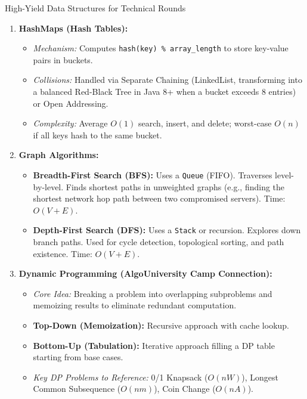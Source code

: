 \documentclass[11pt,a4paper]{article}
\begin{document}
\begin{techbox}{High-Yield Data Structures for Technical Rounds}
\begin{enumerate}
    \item \textbf{HashMaps (Hash Tables):}
    \begin{itemize}
        \item \textit{Mechanism:} Computes \texttt{hash(key) \% array\_length} to store key-value pairs in buckets.
        \item \textit{Collisions:} Handled via Separate Chaining (LinkedList, transforming into a balanced Red-Black Tree in Java 8+ when a bucket exceeds 8 entries) or Open Addressing.
        \item \textit{Complexity:} Average $O(1)$ search, insert, and delete; worst-case $O(n)$ if all keys hash to the same bucket.
    \end{itemize}
    \item \textbf{Graph Algorithms:}
    \begin{itemize}
        \item \textbf{Breadth-First Search (BFS):} Uses a \texttt{Queue} (FIFO). Traverses level-by-level. Finds shortest paths in unweighted graphs (e.g., finding the shortest network hop path between two compromised servers). Time: $O(V + E)$.
        \item \textbf{Depth-First Search (DFS):} Uses a \texttt{Stack} or recursion. Explores down branch paths. Used for cycle detection, topological sorting, and path existence. Time: $O(V + E)$.
    \end{itemize}
    \item \textbf{Dynamic Programming (AlgoUniversity Camp Connection):}
    \begin{itemize}
        \item \textit{Core Idea:} Breaking a problem into overlapping subproblems and memoizing results to eliminate redundant computation.
        \item \textbf{Top-Down (Memoization):} Recursive approach with cache lookup.
        \item \textbf{Bottom-Up (Tabulation):} Iterative approach filling a DP table starting from base cases.
        \item \textit{Key DP Problems to Reference:} 0/1 Knapsack ($O(nW)$), Longest Common Subsequence ($O(nm)$), Coin Change ($O(nA)$).
    \end{itemize}
\end{enumerate}
\end{techbox}
\end{document}
